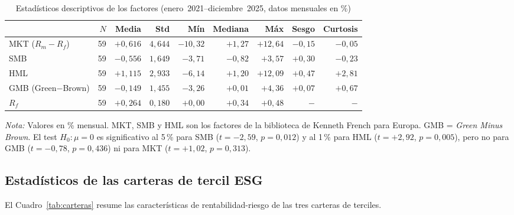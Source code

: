 \documentclass[12pt, a4paper]{article}
\begin{document}
\begin{table}[H]
  \centering
  \caption{Estad\'isticos descriptivos de los factores (enero~2021--diciembre~2025,
  datos mensuales en \%)}
  \label{tab:descriptivos_gmb}
  \small
  \begin{tabular}{lrrrrrrrr}
    \toprule
    & $N$ & Media & Std & M\'in & Mediana & M\'ax & Sesgo & Curtosis \\
    \midrule
    MKT ($R_m - R_f$)  & 59 & $+0{,}616$ & $4{,}644$ & $-10{,}32$ & $+1{,}27$ & $+12{,}64$ & $-0{,}15$ & $-0{,}05$ \\
    SMB                & 59 & $-0{,}556$ & $1{,}649$ & $-3{,}71$  & $-0{,}82$ & $+3{,}57$  & $+0{,}30$ & $-0{,}23$ \\
    HML                & 59 & $+1{,}115$ & $2{,}933$ & $-6{,}14$  & $+1{,}20$ & $+12{,}09$ & $+0{,}47$ & $+2{,}81$ \\
    GMB (Green$-$Brown) & 59 & $-0{,}149$ & $1{,}455$ & $-3{,}26$ & $+0{,}01$ & $+4{,}36$  & $+0{,}07$ & $+0{,}67$ \\
    $R_f$              & 59 & $+0{,}264$ & $0{,}180$ & $+0{,}00$  & $+0{,}34$ & $+0{,}48$  & $-$ & $-$ \\
    \bottomrule
  \end{tabular}
  \begin{minipage}{\linewidth}
    \small\vspace{0.3em}
    \textit{Nota:} Valores en \% mensual. MKT, SMB y HML son los factores de la
    biblioteca de Kenneth French para Europa. GMB = \textit{Green Minus Brown}.
    El test $H_0\colon\mu=0$ es significativo al 5\,\% para SMB ($t=-2{,}59$,
    $p=0{,}012$) y al 1\,\% para HML ($t=+2{,}92$, $p=0{,}005$), pero no para
    GMB ($t=-0{,}78$, $p=0{,}436$) ni para MKT ($t=+1{,}02$, $p=0{,}313$).
  \end{minipage}
\end{table}

\subsection{Estad\'isticos de las carteras de tercil ESG}
\label{subsec:carteras}

El Cuadro~\ref{tab:carteras} resume las caracter\'isticas de rentabilidad-riesgo de
las tres carteras de terciles.
\end{document}
